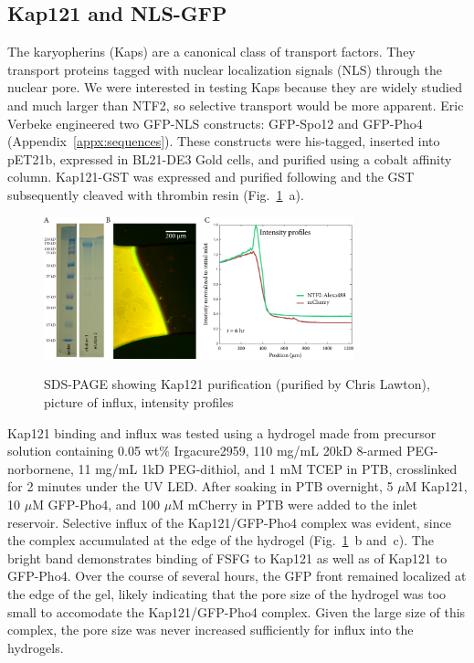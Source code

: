 \subsection{Kap121 and NLS-GFP}
The karyopherins (Kaps) are a canonical class of transport factors.  They transport proteins tagged with nuclear localization signals (NLS) through the nuclear pore.  We were interested in testing Kaps because they are widely studied and much larger than NTF2, so selective transport would be more apparent.  Eric Verbeke engineered two GFP-NLS constructs: GFP-Spo12 and GFP-Pho4 (Appendix~\ref{appx:sequences}).  These constructs were his-tagged, inserted into pET21b, expressed in BL21-DE3 Gold cells, and purified using a cobalt affinity column. 
Kap121-GST was expressed and purified following \cite{tetenbaum-novatt12} and the GST subsequently cleaved with thrombin resin (Fig.~\ref{fig:Kap121}~a).
\begin{figure} %
\caption{SDS-PAGE showing Kap121 purification (purified by Chris Lawton), picture of influx, intensity profiles}
\centering
\includegraphics[width=0.8\textwidth]{figs/ch03/Kap121}
\label{fig:Kap121}
\end{figure} %


Kap121 binding and influx was tested using a hydrogel made from precursor solution containing 0.05 wt\% Irgacure2959, 110 mg/mL 20kD 8-armed PEG-norbornene, 11 mg/mL 1kD PEG-dithiol, and 1 mM TCEP in PTB, crosslinked for 2 minutes under the UV LED.  After soaking in PTB overnight, 5 $\mu$M Kap121, 10 $\mu$M GFP-Pho4, and 100 $\mu$M mCherry in PTB were added to the inlet reservoir.  Selective influx of the Kap121/GFP-Pho4 complex was evident, since the complex accumulated at the edge of the hydrogel (Fig.~\ref{fig:Kap121}~b and~c).  The bright band demonstrates binding of FSFG to Kap121 as well as of Kap121 to GFP-Pho4.  Over the course of several hours, the GFP front remained localized at the edge of the gel, likely indicating that the pore size of the hydrogel was too small to accomodate the Kap121/GFP-Pho4 complex.  Given the large size of this complex, the pore size was never increased sufficiently for influx into the hydrogels.

